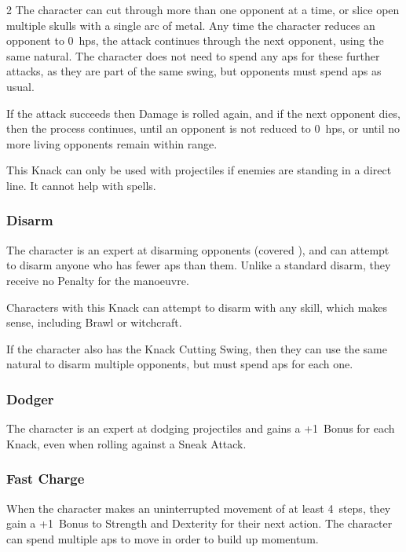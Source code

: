 \begin{multicols}{2}
The character can cut through more than one opponent at a time, or slice open multiple skulls with a single arc of metal.
Any time the character reduces an opponent to 0~\glspl{hp}, the attack continues through the next opponent, using the same \gls{natural}.
The character does not need to spend any \glspl{ap} for these further attacks, as they are part of the same swing, but opponents must spend \glspl{ap} as usual.

If the attack succeeds then Damage is rolled again, and if the next opponent dies, then the process continues, until an opponent is not reduced to 0~\glspl{hp}, or until no more living opponents remain within range.

This Knack can only be used with \glspl{projectile} if enemies are standing in a direct line.
It cannot help with \glspl{spell}.

\subsubsection{Disarm}

The character is an expert at disarming opponents (covered ), and can attempt to disarm anyone who has fewer \glspl{ap} than them.
Unlike a standard disarm, they receive no Penalty for the manoeuvre.

Characters with this Knack can attempt to disarm with any \gls{skill}, which makes sense, including Brawl or \gls{witchcraft}.

If the character also has the Knack Cutting Swing, then they can use the same \gls{natural} to disarm multiple opponents, but must spend \glspl{ap} for each one.

\subsubsection{Dodger}
\label{dodger}

The character is an expert at dodging \glspl{projectile} and gains a +1~Bonus
for each Knack, even when rolling against a Sneak Attack.

\subsubsection{Fast Charge}

When the character makes an uninterrupted movement of at least 4~\glspl{step},
they gain a +1~Bonus to Strength and Dexterity for their next \gls{action}.
The character can spend multiple \glspl{ap} to move in order to build up
momentum.


\end{multicols}
